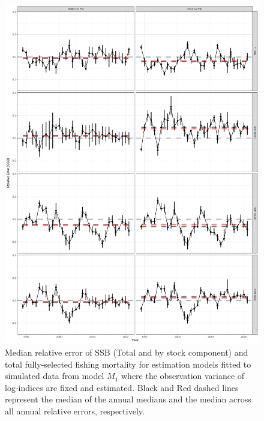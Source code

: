\documentclass[
]{article}
\begin{document}
\begin{figure}

{\centering \includegraphics[width=1\linewidth]{self_test_results} 

}

\caption{Median relative error of SSB (Total and by stock component) and total fully-selected fishing mortality for estimation models fitted to simulated data from model $M_1$ where the observation variance of log-indices are fixed and estimated. Black and Red dashed lines represent the median of the annual medians and the median across all annual relative errors, respectively.}\label{fig:self-test-fig}
\end{figure}
\end{document}
